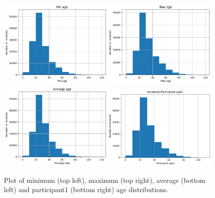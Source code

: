 \documentclass[11pt,a4paper]{report}
\begin{document}
\begin{figure}[h]
	\centering
	\includegraphics[width=0.5\textwidth]{min_age_du}\includegraphics[width=0.5\textwidth]{max_age_du}
	\includegraphics[width=0.5\textwidth]{avg_age_du}\includegraphics[width=0.5\textwidth]{part_age_du}
	\caption{Plot of minimum (top left), maximum (top right), average (bottom left) and participant1 (bottom right) age distributions.}
	\label{age_du}
\end{figure}
\end{document}
